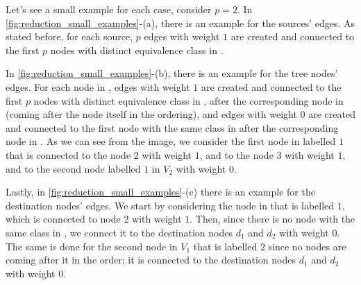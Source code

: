 Let's see a small example for each case, consider $p=2$. In \cref{fig:reduction_small_examples}-(a), there is an example for the sources' edges. As stated before, for each source, $p$ edges with weight $1$ are created and connected to the first $p$ nodes with distinct equivalence class in .

In \cref{fig:reduction_small_examples}-(b), there is an example for the tree nodes' edges. For each node in , edges with weight $1$ are created and connected to the first $p$ nodes with distinct equivalence class in , after the corresponding node in  (coming after the node itself in the ordering), and edges with weight $0$ are created and connected to the first node with the same class in  after the corresponding node in . As we can see from the image, we consider the first node in  labelled $1$ that is connected to the node $2$ with weight $1$, and to the node $3$ with weight $1$, and to the second node labelled $1$ in $V_2$ with weight $0$.

Lastly, in \cref{fig:reduction_small_examples}-(c) there is an example for the destination nodes' edges. We start by considering the node in  that is labelled $1$, which is connected to node $2$ with weight $1$. Then, since there is no node with the same class in , we connect it to the destination nodes $d_1$ and $d_2$ with weight $0$. The same is done for the second node in $V_1$ that is labelled $2$ since no nodes are coming after it in the order; it is connected to the destination nodes $d_1$ and $d_2$ with weight $0$.

